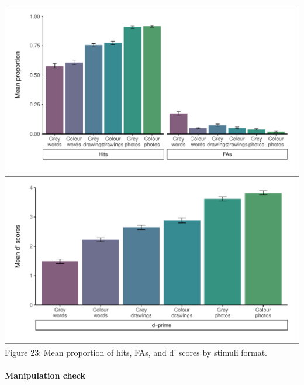\documentclass[
  11pt,
]{article}
\begin{document}
\includegraphics{R--Thesis_files/figure-latex/unnamed-chunk-81-1.pdf}
\includegraphics{R--Thesis_files/figure-latex/unnamed-chunk-81-2.pdf}
Figure 23: Mean proportion of hits, FAs, and d' scores by stimuli
format.

\newpage

\hypertarget{manipulation-check}{%
\paragraph{Manipulation check}\label{manipulation-check}}
\end{document}
